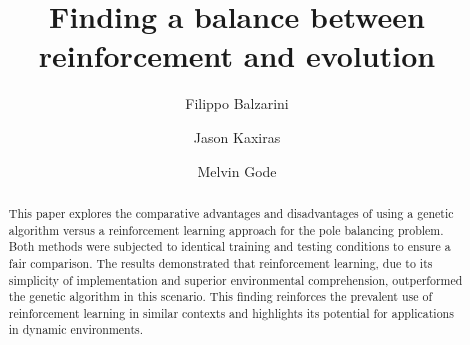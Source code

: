 \begin{frontmatter}
%
\title{%
Finding a balance between\\reinforcement and evolution\\
}
%
\author[UppsalaUniversity]{Filippo Balzarini} 
\author[UppsalaUniversity]{Jason Kaxiras}
\author[UppsalaUniversity]{Melvin Gode}
\address[UppsalaUniversity]{Department of Computer Science, Uppsala University, Uppsala, Sweden}
%
%
\renewcommand*{\today}{\MonthYearDateFormat\displaydate{dateName}} 
%
\begin{abstract}
This paper explores the comparative advantages and disadvantages of using a genetic algorithm versus a reinforcement learning approach for the pole balancing problem. Both methods were subjected to identical training and testing conditions to ensure a fair comparison. The results demonstrated that reinforcement learning, due to its simplicity of implementation and superior environmental comprehension, outperformed the genetic algorithm in this scenario. This finding reinforces the prevalent use of reinforcement learning in similar contexts and highlights its potential for applications in dynamic environments.

\end{abstract}
%
\end{frontmatter}
%
%
%

